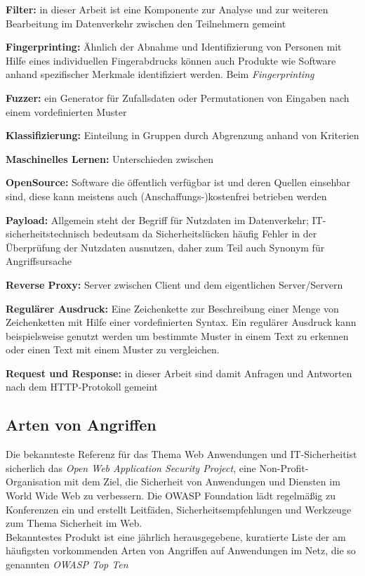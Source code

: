 \textbf{Filter:} in dieser Arbeit ist eine Komponente zur Analyse und zur weiteren Bearbeitung im Datenverkehr zwischen den Teilnehmern gemeint

\textbf{Fingerprinting:} Ähnlich der Abnahme und Identifizierung von Personen mit Hilfe eines individuellen Fingerabdrucks können auch Produkte wie Software anhand spezifischer Merkmale identifiziert werden. Beim \emph{Fingerprinting}

\textbf{Fuzzer:} ein Generator für Zufallsdaten oder Permutationen von Eingaben nach einem vordefinierten Muster

\textbf{Klassifizierung:} Einteilung in Gruppen durch Abgrenzung anhand von Kriterien

\textbf{Maschinelles Lernen:} Unterschieden zwischen 

\textbf{OpenSource:} Software die öffentlich verfügbar ist und deren Quellen einsehbar sind, diese kann meistens auch (Anschaffungs-)kostenfrei betrieben werden

\textbf{Payload:} Allgemein steht der Begriff für Nutzdaten im Datenverkehr; IT-sicherheitstechnisch bedeutsam da Sicherheitslücken häufig Fehler in der Überprüfung der Nutzdaten ausnutzen, daher zum Teil auch Synonym für Angriffsursache

\textbf{Reverse Proxy:} Server zwischen Client und dem eigentlichen Server/Servern 

\textbf{Regulärer Ausdruck:} Eine Zeichenkette zur Beschreibung einer Menge von Zeichenketten mit Hilfe einer vordefinierten Syntax. Ein regulärer Ausdruck kann beispielsweise genutzt werden um bestimmte Muster in einem Text zu erkennen oder einen Text mit einem Muster zu vergleichen.

\textbf{Request und Response:} in dieser Arbeit sind damit Anfragen und Antworten nach dem HTTP-Protokoll gemeint

\subsection{Arten von Angriffen}

Die bekannteste Referenz für das Thema \glqq Web Anwendungen und IT-Sicherheit\grqq  ist sicherlich das \emph{Open Web Application Security Project\textsuperscript{\textregistered}}, eine Non-Profit-Organisation mit dem Ziel, die Sicherheit von Anwendungen und Diensten im World Wide Web zu verbessern\cite{wpowasp}. Die OWASP Foundation lädt regelmäßig zu Konferenzen ein und erstellt Leitfäden, Sicherheitsempfehlungen und Werkzeuge zum Thema Sicherheit im Web.\\
Bekanntestes Produkt ist eine jährlich herausgegebene, kuratierte Liste der am häufigsten vorkommenden Arten von Angriffen auf Anwendungen im Netz, die so genannten \emph{OWASP Top Ten}\cite{owasp10}

